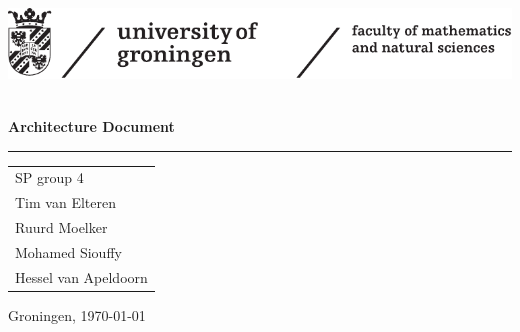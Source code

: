 \documentclass[a4paper, 10pt]{report}
\begin{document}
	\thispagestyle{empty}
	\includegraphics[trim = .5cm 0cm 0cm 0cm]{../images/RuGFWNlogo.pdf} \\
	\vspace{.5cm} \\
	\vspace{.5cm}
	\begin{flushleft}
		\huge \bf Architecture Document %
	\end{flushleft}
	\rule{\linewidth}{1.5pt}
	\begin{flushright}
		\large
		\begin{tabular}{l}
			{\Large \sc SP group 4} \\
			Tim van Elteren\\
			Ruurd Moelker\\
			Mohamed Siouffy\\
			Hessel van Apeldoorn \\
		\end{tabular}
	\end{flushright}
	\begin{center}
		\vfill
		\large Groningen, \today
	\end{center}
\end{document}
